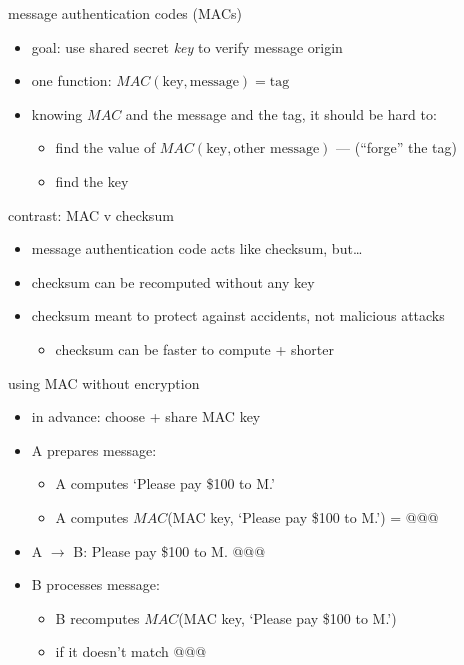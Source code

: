 \begin{frame}{message authentication codes (MACs)}
    \begin{itemize}
    \item goal: use shared secret \textit{key} to verify message origin
    \vspace{.5cm}
    \item one function: $MAC(\text{key}, \text{message}) = \text{tag}$
    \item knowing $MAC$ and the message and the tag, it should be hard to:
        \begin{itemize}
        \item find the value of $MAC(\text{key}, \text{other message})$ --- (``forge'' the tag)
        \item find the key
        \end{itemize}
    \end{itemize}
\end{frame}

\begin{frame}{contrast: MAC v checksum}
    \begin{itemize}
    \item message authentication code acts like checksum, but\ldots
    \vspace{.5cm}
    \item checksum can be recomputed without any key
    \item checksum meant to protect against accidents, not malicious attacks
        \begin{itemize}
        \item checksum can be faster to compute + shorter
        \end{itemize}
    \end{itemize}
\end{frame}

\begin{frame}{using MAC without encryption}
    \begin{itemize}
    \item in advance: choose + share MAC key
    \vspace{.5cm}
    \item A prepares message:
    \begin{itemize}
    \item A computes `Please pay \$100 to M.'
    \item A computes $MAC$(MAC key, `Please pay \$100 to M.') = @@@
    \end{itemize}
    \item A $\rightarrow$ B: Please pay \$100 to M. @@@
    \item<2-> B processes message:
    \begin{itemize}
        \item B recomputes $MAC$(MAC key, `Please pay \$100 to M.')
        \item {} if it doesn't match @@@
    \end{itemize}
    \end{itemize}
\end{frame}

